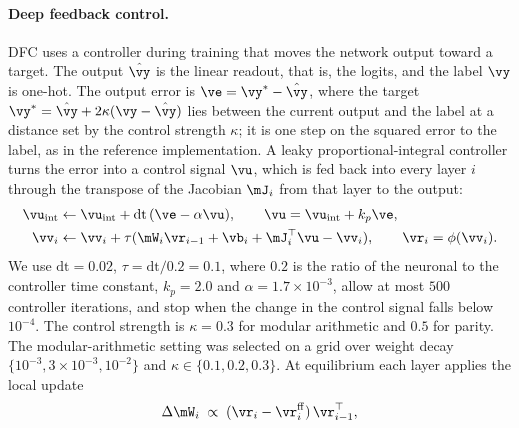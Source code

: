 \documentclass{article} %
\begin{document}
\paragraph{Deep feedback control.} DFC uses a controller during training that moves the network output toward a target. The output $\hat{\vy}$ is the linear readout, that is, the logits, and the label $\vy$ is one-hot. The output error is $\ve = \vy^* - \hat{\vy}$, where the target $\vy^* = \hat{\vy} + 2\kappa(\vy - \hat{\vy})$ lies between the current output and the label at a distance set by the control strength $\kappa$; it is one step on the squared error to the label, as in the reference implementation. A leaky proportional-integral controller turns the error into a control signal $\vu$, which is fed back into every layer $i$ through the transpose of the Jacobian $\mJ_i$ from that layer to the output:
\begin{align}
\vu_{\mathrm{int}} &\leftarrow \vu_{\mathrm{int}} + \mathrm{dt}\,(\ve - \alpha \vu),
\qquad \vu = \vu_{\mathrm{int}} + k_p \ve, \label{eq:controller}\\
\vv_i &\leftarrow \vv_i + \tau ( \mW_i \vr_{i-1} + \vb_i + \mJ_i^\top \vu - \vv_i ),
\qquad \vr_i = \phi(\vv_i). \label{eq:dynamics}
\end{align}
We use $\mathrm{dt} = 0.02$, $\tau = \mathrm{dt}/0.2 = 0.1$, where $0.2$ is the ratio of the neuronal to the controller time constant, $k_p = 2.0$ and $\alpha = 1.7\times10^{-3}$, allow at most $500$ controller iterations, and stop when the change in the control signal falls below $10^{-4}$. The control strength is $\kappa = 0.3$ for modular arithmetic and $0.5$ for parity. The modular-arithmetic setting was selected on a grid over weight decay $\{10^{-3}, 3\times10^{-3}, 10^{-2}\}$ and $\kappa \in \{0.1, 0.2, 0.3\}$. At equilibrium each layer applies the local update
\begin{equation}
\Delta \mW_i \;\propto\; (\vr_i - \vr_i^{\mathrm{ff}})\, \vr_{i-1}^\top,
\label{eq:update}
\end{equation}
\end{document}
